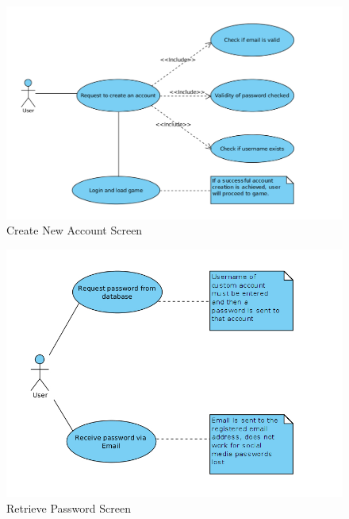 \documentclass[letterpaper]{article}
\begin{document}
					\begin{figure}[H]
					\centering
					\includegraphics[width=140mm]{UML_Diagram/Use_Case/CreatAccount_UseCase.jpg}
					\caption{Create New Account Screen}
					\end{figure}
				
					\begin{figure}[H]
					\centering
					\includegraphics[width=140mm]{UML_Diagram/Use_Case/RetrievePassword_UseCase.jpg}
					\caption{Retrieve Password Screen}
					\end{figure}
				
\end{document}
